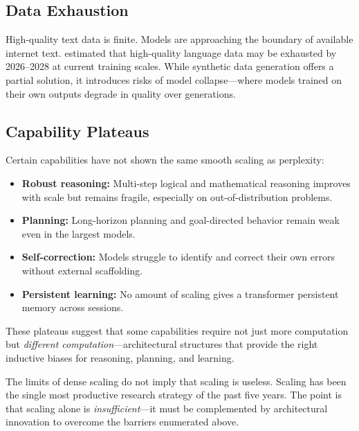 \subsection{Data Exhaustion}

High-quality text data is finite. Models are approaching the boundary of available internet text. \citet{villalobos2022} estimated that high-quality language data may be exhausted by 2026--2028 at current training scales. While synthetic data generation offers a partial solution, it introduces risks of model collapse---where models trained on their own outputs degrade in quality over generations.

\subsection{Capability Plateaus}

Certain capabilities have not shown the same smooth scaling as perplexity:

\begin{itemize}[leftmargin=1.8em]
  \item \textbf{Robust reasoning:} Multi-step logical and mathematical reasoning improves with scale but remains fragile, especially on out-of-distribution problems.
  \item \textbf{Planning:} Long-horizon planning and goal-directed behavior remain weak even in the largest models.
  \item \textbf{Self-correction:} Models struggle to identify and correct their own errors without external scaffolding.
  \item \textbf{Persistent learning:} No amount of scaling gives a transformer persistent memory across sessions.
\end{itemize}

These plateaus suggest that some capabilities require not just more computation but \emph{different computation}---architectural structures that provide the right inductive biases for reasoning, planning, and learning.

\begin{remark}
The limits of dense scaling do not imply that scaling is useless. Scaling has been the single most productive research strategy of the past five years. The point is that scaling alone is \emph{insufficient}---it must be complemented by architectural innovation to overcome the barriers enumerated above.
\end{remark}

